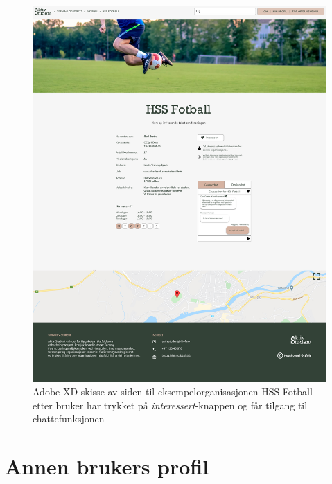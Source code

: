 \begin{figure}[H]
\centering
\includegraphics[width=\textwidth]{Illustrasjoner/Skisser-pdf/3.0/3-6-organisasjonsside-trykket-interessert.pdf}
\caption{Adobe XD-skisse av siden til eksempelorganisasjonen HSS Fotball etter bruker har trykket på {\em interessert}-knappen og får tilgang til chattefunksjonen}
\label{vedlegg:3-6-org-trykket-interessert}
\end{figure}

\section{Annen brukers profil}

